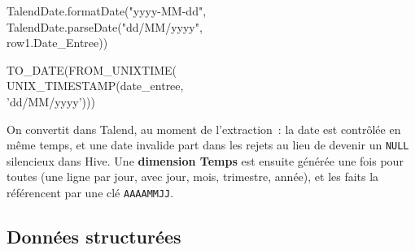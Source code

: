 \begin{center}
\begin{minipage}[t]{0.47\textwidth}
\begin{tcolorbox}[colback=orange!6,colframe=orange!70!black,title=\textbf{Dans Talend} (avant chargement),fonttitle=\small,boxsep=2pt]
\ttfamily\scriptsize
TalendDate.formatDate("yyyy-MM-dd",\\
\hspace*{1em}TalendDate.parseDate("dd/MM/yyyy",\\
\hspace*{2em}row1.Date\_Entree))
\end{tcolorbox}
\end{minipage}\hfill
\begin{minipage}[t]{0.47\textwidth}
\begin{tcolorbox}[colback=title2!6,colframe=title1,title=\textbf{Dans Hive} (après chargement),fonttitle=\small,boxsep=2pt]
\ttfamily\scriptsize
TO\_DATE(FROM\_UNIXTIME(\\
\hspace*{1em}UNIX\_TIMESTAMP(date\_entree,\\
\hspace*{2em}'dd/MM/yyyy')))
\end{tcolorbox}
\end{minipage}
\end{center}

\noindent On convertit dans Talend, au moment de l'extraction~: la date est contrôlée en même temps, et une date invalide part dans les rejets au lieu de devenir un \texttt{NULL} silencieux dans Hive. Une \textbf{dimension Temps} est ensuite générée une fois pour toutes (une ligne par jour, avec jour, mois, trimestre, année), et les faits la référencent par une clé \texttt{AAAAMMJJ}.

\subsection{Données structurées}

